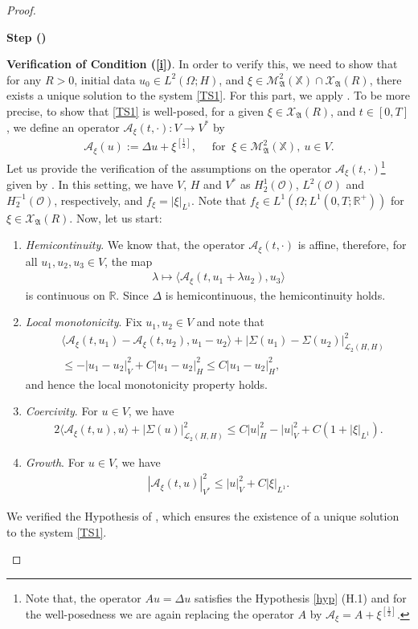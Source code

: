 \documentclass[english,a4paper,11pt]{amsart}
\theoremstyle{plain}
\theoremstyle{definition}
\theoremstyle{remark}
\renewcommand{\emph}[1]{{\sl #1}}
\numberwithin{equation}{section}
\newcounter{lil1}
\newenvironment{step}
{\begin{list} { \bf Step (\Roman{lil1})}
		{ \usecounter{lil1}
			\setlength{\leftmargin}{0.0cm}
			\setlength{\topsep}{0.2cm}
			\setlength{\itemsep}{0.0cm}
			\setlength{\parsep}{0.1cm}
			\setlength{\itemindent}{0.8cm}
			\setlength{\parskip}{0.0cm}}}
	{\end{list}}
\newcounter{lil33}
\newcounter{lil1q}
\newcommand{\MA}{\mathfrak{A}}
\newcommand{\la}{\langle}
\newcommand{\ra}{\rangle}
\newcommand{\CO}{{{ \mathcal O }}}
\newcommand{\CA}{{{ \mathcal A }}}
\newcommand{\RR}{{\mathbb{R}}}
\newcommand{\Mcal} {{\mathcal M}}
\newcommand{\Afrak} {{\mathfrak A}}
\newcommand{\R}{\mathbb{R}}
\newcommand{\X}{\mathbb{X}}
\renewcommand{\emph}[1]{{\sl #1}}
\begin{document}
\begin{proof}
\begin{step}
	\item 
\textbf{Verification of Condition (\ref{i})}.
In order to verify this, we need to show that for any \(R>0\), initial data \(u_0\in L^2(\Omega;H)\), and \(\xi\in \Mcal_{\Afrak}^2(\X)\cap \mathcal{X}_\MA(R)\), there exists a unique solution to the system \eqref{TS1}. For this part, we apply  \cite[Theorem 5.1.3]{weiroeckner}.
To be more precise, to show that \eqref{TS1} is well-posed,  for a given $\xi \in \mathcal{X}_\MA(R)$, and  $t\in [0,T]$, we define an operator 
$\CA_\xi(t,\cdot):V \to V^\ast$ by
\begin{align*}
	\CA_\xi (u):=  \Delta u+\xi^{[\frac{1}{2}]}, \quad \text{ for } \ \xi\in \Mcal_{\Afrak}^2(\X),\ u\in V. 
\end{align*}
Let us provide the verification of the assumptions on the operator $\CA_\xi(t,\cdot)$\footnote{Note that, the operator $Au=\Delta u$ satisfies the Hypothesis \ref{hyp} (H.1) and for the well-posedness we are again replacing the operator $A$ by $\mathcal{A}_\xi=A+\xi^{[\frac{1}{2}]}$.} given by \cite[Theorem 5.1.3]{weiroeckner}. 
In this setting, we have $V$, $H$ and $V^\ast$ as $H_2^1(\CO)$, $L^2(\CO)$ and $H_2^{-1}(\CO)$, respectively,
and $f_\xi=|\xi|_{L^1}$. Note that $f_\xi\in L^1(\Omega;L^1(0,T;\RR^+))$ for $\xi\in\mathcal{X}_\MA(R)$.
Now, let us start:

\begin{enumerate}
	
	\item \emph{Hemicontinuity}. We know that, the operator $\CA_\xi(t,\cdot)$ is affine, therefore, for all $u_1,u_2,u_3\in V$, the map 
	\begin{align*}
		\lambda \mapsto \big\la \CA_\xi(t,u_1+\lambda u_2),u_3\big\ra
	\end{align*}
	is continuous on $\R$. Since $\Delta$ is hemicontinuous, the hemicontinuity holds.
	
	\item \emph{Local monotonicity}. Fix $u_1,u_2\in V$ and note that 
	\begin{align*}
		&\big\la \CA_\xi(t,u_1)-\CA_\xi(t,u_2),u_1-u_2\big\ra+|\Sigma(u_1)-\Sigma(u_2)|_{\mathcal{L}_2(H,H)}^2\\& \leq -|u_1-u_2|_{V}^2+C|u_1-u_2|_H^2
		\leq C|u_1-u_2|_H^2, 
	\end{align*}and hence the local monotonicity property holds.
	\item \emph{Coercivity}. For $u\in V$, we have 
	\begin{align*}
		2\big\la\CA_\xi(t,u),u\big\ra+|\Sigma(u)|_{\mathcal{L}_2(H,H)}^2 \leq C|u|_{H}^2-|u|_V^2+C(1+|\xi|_{L^1}).
	\end{align*}
	\item \emph{Growth}.  For $u\in V$, we have 
	\begin{align*}
		|\CA_\xi(t,u)|_{V^\ast}^2 \leq |u|_V^2+C|\xi|_{L^1}.
	\end{align*}
\end{enumerate}
We verified the Hypothesis of \cite[Theorem 5.1.3]{weiroeckner}, which ensures the existence of a unique solution to the system \eqref{TS1}.


\end{step}
\end{proof}
\end{document}
